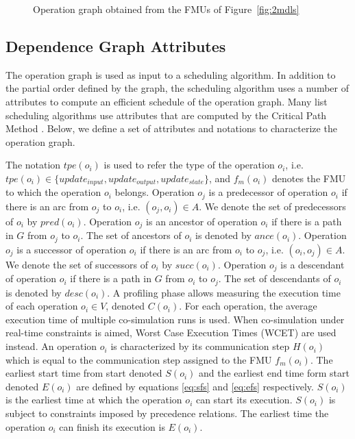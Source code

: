 \begin{figure}[htb]
\centering
  
\caption{Operation graph obtained from the FMUs of Figure~\ref{fig:2mdls}}
\label{fig:dag}
\end{figure} 

\subsection{Dependence Graph Attributes}

The operation graph is used as input to a scheduling algorithm. In addition to the partial order defined by the graph, the scheduling algorithm uses a number of attributes to compute an efficient schedule of the operation graph. Many list scheduling algorithms use attributes that are computed by the Critical Path Method \cite{kohler:1975}. Below, we define a set of attributes and notations to characterize the operation graph.

The notation $tpe(o_i)$ is used to refer the type of the operation $o_i$, i.e. $tpe(o_i) \in \{update_{input}, update_{output}, update_{state}\}$, and $f_m(o_i)$ denotes the FMU to which the operation $o_i$ belongs. Operation $o_j$ is a predecessor of operation $o_i$ if there is an arc from $o_j$ to $o_i$, i.e. $(o_j, o_i) \in A$. We denote the set of predecessors of $o_i$ by $pred(o_i)$. Operation $o_j$ is an ancestor of operation $o_i$ if there is a path in $G$ from $o_j$ to $o_i$. The set of ancestors of $o_i$ is denoted by $ance(o_i)$. Operation $o_j$ is a successor of operation $o_i$ if there is an arc from $o_i$ to $o_j$, i.e. $(o_i, o_j) \in A$. We denote the set of successors of $o_i$ by $succ(o_i)$. Operation $o_j$ is a descendant of operation $o_i$ if there is a path in $G$ from $o_i$ to $o_j$. The set of descendants of $o_i$ is denoted by $desc(o_i)$. A profiling phase allows measuring the execution time of each operation $o_i \in V$, denoted $C(o_i)$. For each operation, the average execution time of multiple co-simulation runs is used. When co-simulation under real-time constraints is aimed, Worst Case Execution Times (WCET) are used instead. An operation $o_i$ is characterized by its communication step $H(o_i)$ which is equal to the communication step assigned to the FMU $f_m(o_i)$. The earliest start time from start denoted $S(o_i)$ and the earliest end time form start denoted $E(o_i)$ are defined by equations \ref{eq:sfs} and \ref{eq:efs} respectively. $S(o_i)$ is the earliest time at which the operation $o_i$ can start its execution. $S(o_i)$ is subject to constraints imposed by precedence relations. The earliest time the operation $o_i$ can finish its execution is $E(o_i)$.

